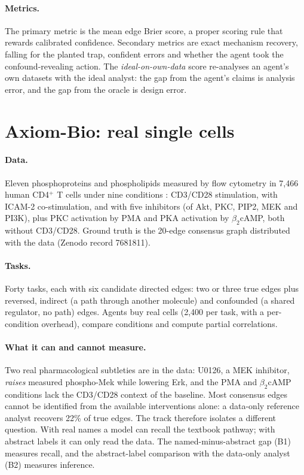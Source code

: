 \documentclass[11pt]{article}
\begin{document}
\paragraph{Metrics.}
The primary metric is the mean edge Brier score, a proper scoring rule that rewards calibrated confidence.
Secondary metrics are exact mechanism recovery, falling for the planted trap, confident errors and whether the agent took the confound-revealing action.
The \emph{ideal-on-own-data} score re-analyses an agent's own datasets with the ideal analyst: the gap from the agent's claims is analysis error, and the gap from the oracle is design error.

\section{Axiom-Bio: real single cells}
\paragraph{Data.} Eleven phosphoproteins and phospholipids measured by flow cytometry in 7{,}466 human CD4$^+$ T cells under nine conditions \citep{sachs2005causal}: CD3/CD28 stimulation, with ICAM-2 co-stimulation, and with five inhibitors (of Akt, PKC, PIP2, MEK and PI3K), plus PKC activation by PMA and PKA activation by $\beta_2$cAMP, both without CD3/CD28. Ground truth is the 20-edge consensus graph distributed with the data (Zenodo record 7681811).
\paragraph{Tasks.} Forty tasks, each with six candidate directed edges: two or three true edges plus reversed, indirect (a path through another molecule) and confounded (a shared regulator, no path) edges. Agents buy real cells (2{,}400 per task, with a per-condition overhead), compare conditions and compute partial correlations.
\paragraph{What it can and cannot measure.} Two real pharmacological subtleties are in the data: U0126, a MEK inhibitor, \emph{raises} measured phospho-Mek while lowering Erk, and the PMA and $\beta_2$cAMP conditions lack the CD3/CD28 context of the baseline. Most consensus edges cannot be identified from the available interventions alone: a data-only reference analyst recovers 22\% of true edges. The track therefore isolates a different question. With real names a model can recall the textbook pathway; with abstract labels it can only read the data. The named-minus-abstract gap (B1) measures recall, and the abstract-label comparison with the data-only analyst (B2) measures inference.
\end{document}
